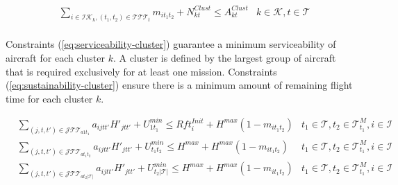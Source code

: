 \documentclass[a4paper,onecolumn,fleqn]{article}
\begin{document}

    \begin{align}
       & \sum_{i \in \mathcal{IK}_k, (t_1, t_2) \in \mathcal{T}\mathcal{T}\mathcal{T}_{t}} m_{it_1t_2} + N^{Clust}_{kt} \leq A^{Clust}_{kt}
        &k \in \mathcal{K}, t \in \mathcal{T} \label{eq:serviceability-cluster} \\
    \end{align}

    Constraints (\ref{eq:serviceability-cluster}) guarantee a minimum serviceability of aircraft for each cluster $k$. A cluster is defined by the largest group of aircraft that is required exclusively for at least one mission. Constraints (\ref{eq:sustainability-cluster}) ensure there is a minimum amount of remaining flight time for each cluster $k$.

    \begin{align}
        & \sum_{(j, t, t') \in \mathcal{J}\mathcal{T}\mathcal{T}_{a1t_1}} a_{ijtt'} H'_{jtt'} + U^{min}_{1t_1} \leq Rft^{Init}_i + H^{max} (1 - m_{it_1t_2}) 
                & t_1 \in \mathcal{T}, t_2 \in \mathcal{T}^M_{t_1}, i \in \mathcal{I}\label{eq:cycle_hours1}\\
        & \sum_{(j, t, t') \in \mathcal{J}\mathcal{T}\mathcal{T}_{at_1t_2}} a_{ijtt'} H'_{jtt'} + U^{min}_{t_1t_2} \leq H^{max} + H^{max} (1 - m_{it_1t_2}) 
                & t_1 \in \mathcal{T}, t_2 \in \mathcal{T}^M_{t_1}, i \in \mathcal{I}\label{eq:cycle_hours2}\\
        & \sum_{(j, t, t') \in \mathcal{J}\mathcal{T}\mathcal{T}_{at_2|\mathcal{T}|}} a_{ijtt'} H'_{jtt'} + U^{min}_{t_2|\mathcal{T}|} \leq H^{max} + H^{max} (1 - m_{it_1t_2}) 
                & t_1 \in \mathcal{T}, t_2 \in \mathcal{T}^M_{t_1}, i \in \mathcal{I}\label{eq:cycle_hours3}
    \end{align}
\end{document}
